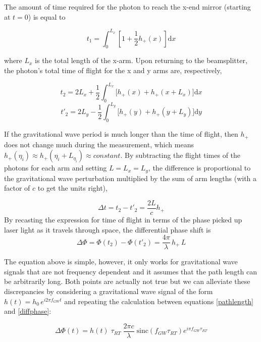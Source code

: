 	The amount of time required for the photon to reach the x-end mirror (starting at $t=0$) is equal to
	
	\begin{equation}\label{pathlength}
	t_1 = \int_{0}^{L_{x}} [1+\frac{1}{2}  h_{+}(x) ] \text{d}x
	\end{equation}
	
	where $L_x$ is the total length of the x-arm.  Upon returning to the beamsplitter, the photon's total time of flight for the x and y arms are, respectively,
	
	\begin{equation}
	t_2 = 2 L_x + \frac{1}{2} \int_{0}^{L_x} \bigg[  h_{+}(x) +  h_{+}(x + L_x)  \bigg] \text{d}x
	\end{equation}
	\begin{equation}
	t'_{2}= 2 L_y - \frac{1}{2} \int_{0}^{L_y} \bigg[  h_{+}(y) +  h_{+}(y + L_y)  \bigg] \text{d}y
	\end{equation}
	
	If the gravitational wave period is much longer than the time of flight, then $h_{+}$ does not change much during the measurement, which means $h_{+}(\eta_i) \approx h_{+}(\eta_i + L_{\eta_i}) \approx constant$.  By subtracting the flight times of the photons for each arm and setting $L = L_x = L_y$, the difference is proportional to the gravitational wave perturbation multiplied by the sum of arm lengths (with a factor of $c$ to get the units right),
	
	\begin{equation}
	\Delta t = t_2 - t'_{2} = \frac{2L}{c} h_{+}
	\end{equation}
	By recasting the expression for time of flight in terms of the phase picked up laser light as it travels through space, the differential phase shift is
	\begin{equation}\label{diffphase}
	\Delta \Phi = \Phi(t_{2}) - \Phi(t'_{2}) = \frac{4 \pi}{\lambda} \, h_{+} \, L
	\end{equation}
	
	The equation above is simple, however, it only works for gravitational wave signals that are not frequency dependent and it assumes that the path length can be arbitrarily long. Both points are actually not true \cite{Saulson} but we can alleviate these discrepancies by considering a gravitational wave signal of the form $h(t) = h_0 \, e^{i 2 \pi f_{GW} t}$  and repeating the calculation between equations \ref{pathlength} and \ref{diffphase}:
	
	\begin{equation}\label{gwsinc}
	\Delta \Phi (t) = h(t) \; \tau_{RT} \; \frac{2 \pi c}{\lambda} \; \text{sinc}(f_{GW} \tau_{RT}) e^{i \pi f_{GW} \tau_{RT}}
	\end{equation}
	
